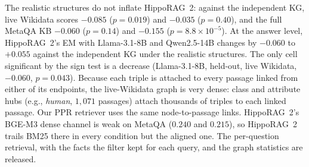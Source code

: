 \documentclass[11pt]{article}
\begin{document}
The realistic structures do not inflate HippoRAG~2: against the independent KG, live Wikidata scores $-0.085$ ($p=0.019$) and $-0.035$ ($p=0.40$), and the full MetaQA KB $-0.060$ ($p=0.14$) and $-0.155$ ($p=8.8\times10^{-5}$). At the answer level, HippoRAG~2's EM with Llama-3.1-8B and Qwen2.5-14B changes by $-0.060$ to $+0.055$ against the independent KG under the realistic structures. The only cell significant by the sign test is a decrease (Llama-3.1-8B, held-out, live Wikidata, $-0.060$, $p=0.043$). Because each triple is attached to every passage linked from either of its endpoints, the live-Wikidata graph is very dense: class and attribute hubs (e.g., \emph{human}, $1{,}071$ passages) attach thousands of triples to each linked passage. Our PPR retriever uses the same node-to-passage links. HippoRAG~2's BGE-M3 dense channel is weak on MetaQA ($0.240$ and $0.215$), so HippoRAG~2 trails BM25 there in every condition but the aligned one. The per-question retrieval, with the facts the filter kept for each query, and the graph statistics are released.

\begin{table}[ht]\centering\footnotesize
\setlength{\tabcolsep}{3pt}
\caption{HippoRAG~2 hit@5 under the aligned (question-induced), independent (OpenIE), and realistic (live Wikidata for 2WikiMultiHop, full KB for MetaQA; none exists for GraphRAG-Bench) KGs, with its own dense-only ranking and BM25. Exact sign test, $^{**}p<0.01$.}
\label{tab:hipporag2more}
\end{table}
\end{document}
